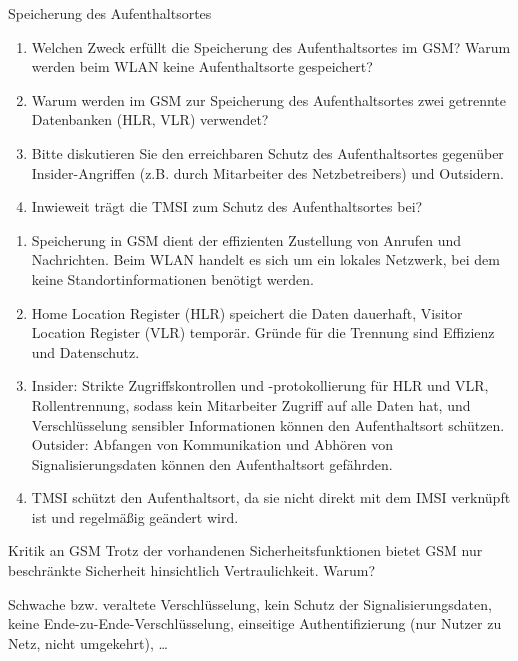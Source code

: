 \documentclass{article}
\begin{document}
\setcounter{subsection}{2220}
\begin{exercise}{Speicherung des Aufenthaltsortes}
  \begin{enumerate}
    \item Welchen Zweck erfüllt die Speicherung des Aufenthaltsortes im GSM? Warum werden beim WLAN keine Aufenthaltsorte gespeichert?
    \item Warum werden im GSM zur Speicherung des Aufenthaltsortes zwei getrennte Datenbanken (HLR, VLR) verwendet?
    \item Bitte diskutieren Sie den erreichbaren Schutz des Aufenthaltsortes gegenüber Insider-Angriffen (z.B. durch Mitarbeiter des Netzbetreibers) und Outsidern.
    \item Inwieweit trägt die TMSI zum Schutz des Aufenthaltsortes bei?
  \end{enumerate}

  \begin{solution}
    \begin{enumerate}
      \item Speicherung in GSM dient der effizienten Zustellung von Anrufen und Nachrichten. Beim WLAN handelt es sich um ein lokales Netzwerk, bei dem keine Standortinformationen benötigt werden.
      \item Home Location Register (HLR) speichert die Daten dauerhaft, Visitor Location Register (VLR) temporär. Gründe für die Trennung sind Effizienz und Datenschutz.
      \item Insider: Strikte Zugriffskontrollen und -protokollierung für HLR und VLR, Rollentrennung, sodass kein Mitarbeiter Zugriff auf alle Daten hat, und Verschlüsselung sensibler Informationen können den Aufenthaltsort schützen. Outsider: Abfangen von Kommunikation und Abhören von Signalisierungsdaten können den Aufenthaltsort gefährden.
      \item TMSI schützt den Aufenthaltsort, da sie nicht direkt mit dem IMSI verknüpft ist und regelmäßig geändert wird.
    \end{enumerate}
  \end{solution}
\end{exercise}

\setcounter{subsection}{2223}
\begin{exercise}{Kritik an GSM}
  Trotz der vorhandenen Sicherheitsfunktionen bietet GSM nur beschränkte Sicherheit hinsichtlich Vertraulichkeit. Warum?

  \begin{solution}
    Schwache bzw. veraltete Verschlüsselung, kein Schutz der Signalisierungsdaten, keine Ende-zu-Ende-Verschlüsselung, einseitige Authentifizierung (nur Nutzer zu Netz, nicht umgekehrt), …
  \end{solution}
\end{exercise}
\end{document}
